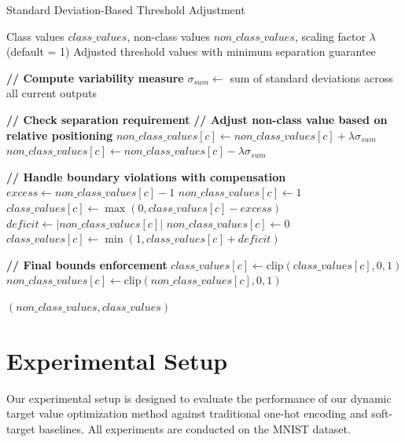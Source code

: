 \documentclass[12pt,fleqn,a4paper]{article}
\begin{document}
\begin{algorithm}[H]
\caption{Standard Deviation-Based Threshold Adjustment}
\label{alg:sigma_spacing}
\begin{algorithmic}[1]
\REQUIRE Class values $class\_values$, non-class values $non\_class\_values$, scaling factor $\lambda$ (default = 1)
\ENSURE Adjusted threshold values with minimum separation guarantee

\STATE \textbf{// Compute variability measure}
\STATE $\sigma_{sum} \leftarrow$ sum of standard deviations across all current outputs

    \STATE \textbf{// Check separation requirement}
        \STATE \textbf{// Adjust non-class value based on relative positioning}
            \STATE $non\_class\_values[c] \leftarrow non\_class\_values[c] + \lambda \sigma_{sum}$
        \ELSE
            \STATE $non\_class\_values[c] \leftarrow non\_class\_values[c] - \lambda \sigma_{sum}$
        \ENDIF
        
        \STATE \textbf{// Handle boundary violations with compensation}
            \STATE $excess \leftarrow non\_class\_values[c] - 1$
            \STATE $non\_class\_values[c] \leftarrow 1$
            \STATE $class\_values[c] \leftarrow \max(0, class\_values[c] - excess)$
            \STATE $deficit \leftarrow |non\_class\_values[c]|$
            \STATE $non\_class\_values[c] \leftarrow 0$
            \STATE $class\_values[c] \leftarrow \min(1, class\_values[c] + deficit)$
        \ENDIF
    \ENDIF
    
    \STATE \textbf{// Final bounds enforcement}
    \STATE $class\_values[c] \leftarrow \text{clip}(class\_values[c], 0, 1)$
    \STATE $non\_class\_values[c] \leftarrow \text{clip}(non\_class\_values[c], 0, 1)$
\ENDFOR

\RETURN $(non\_class\_values, class\_values)$
\end{algorithmic}
\end{algorithm}


\section{Experimental Setup}
 Our experimental setup is designed to evaluate the performance of our dynamic target value optimization method against traditional one-hot encoding and soft-target baselines. All experiments are conducted on the MNIST dataset.
\end{document}
